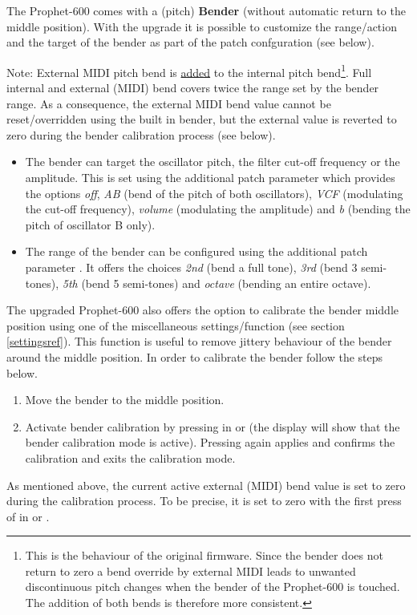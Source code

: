 The Prophet-600 comes with a (pitch) \textbf{Bender} (without automatic return to the middle position). With the upgrade it is possible to customize the range/action and the target of the bender as part of the patch confguration (see below). 

Note: External MIDI pitch bend is \underline{added} to the internal pitch bend\footnote{This is the behaviour of the original firmware. Since the bender does not return to zero a bend override by external MIDI leads to unwanted discontinuous pitch changes when the bender of the Prophet-600 is touched. The addition of both bends is therefore more consistent.}. Full internal and external (MIDI) bend covers twice the range set by the bender range. As a consequence, the external MIDI bend value cannot be reset/overridden using the built in bender, but the external value is reverted to zero during the bender calibration process (see below).

\begin{itemize}
  \item The bender can target the oscillator pitch, the filter cut-off frequency or the amplitude. This is set using the additional patch parameter \bentarget which provides the options \textit{off}, \textit{AB} (bend of the pitch of both oscillators), \textit{VCF} (modulating the cut-off frequency), \textit{volume} (modulating the amplitude) and \textit{b} (bending the pitch of oscillator B only).
  \item The range of the bender can be configured using the additional patch parameter \bendrange. It offers the choices \textit{2nd} (bend a full tone), \textit{3rd} (bend 3 semi-tones), \textit{5th} (bend 5 semi-tones) and \textit{octave} (bending an entire octave).
\end{itemize}

The upgraded Prophet-600 also offers the option to calibrate the bender middle position using one of the miscellaneous settings/function (see section \ref{settingsref}). This function is useful to remove jittery behaviour of the bender around the middle position. In order to calibrate the bender follow the steps below.

\begin{enumerate}
  \item Move the bender to the middle position.  
  \item Activate bender calibration by pressing  in \shiftmode or \shiftlock (the display will show that the bender calibration mode is active). Pressing  again applies and confirms the calibration and exits the calibration mode.
\end{enumerate}

As mentioned above, the current active external (MIDI) bend value is set to zero during the calibration process. To be precise, it is set to zero with the first press of  in \shiftmode or \shiftlock.
